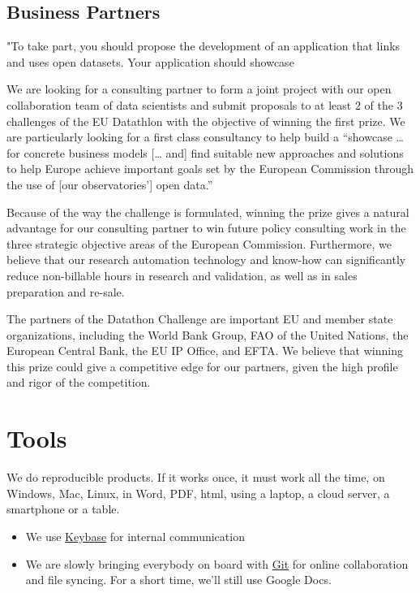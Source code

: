 \documentclass[
  a4paper,
  openany, a4paper, oneside]{book}
\begin{document}
\hypertarget{business-partners}{%
\section{Business Partners}\label{business-partners}}

"To take part, you should propose the development of an application that links and uses open datasets. Your application should showcase

We are looking for a consulting partner to form a joint project with our open collaboration team of data scientists and submit proposals to at least 2 of the 3 challenges of the EU Datathlon with the objective of winning the first prize. We are particularly looking for a first class consultancy to help build a ``showcase \ldots{} for concrete business models {[}\ldots{} and{]} find suitable new approaches and solutions to help Europe achieve important goals set by the European Commission through the use of {[}our observatories'{]} open data.''

Because of the way the challenge is formulated, winning the prize gives a natural advantage for our consulting partner to win future policy consulting work in the three strategic objective areas of the European Commission. Furthermore, we believe that our research automation technology and know-how can significantly reduce non-billable hours in research and validation, as well as in sales preparation and re-sale.

The partners of the Datathon Challenge are important EU and member state organizations, including the World Bank Group, FAO of the United Nations, the European Central Bank, the EU IP Office, and EFTA. We believe that winning this prize could give a competitive edge for our partners, given the high profile and rigor of the competition.

\hypertarget{tools}{%
\chapter{Tools}\label{tools}}

We do reproducible products. If it works once, it must work all the time, on Windows, Mac, Linux, in Word, PDF, html, using a laptop, a cloud server, a smartphone or a table.

\begin{itemize}
\item
  We use \protect\hyperlink{keybase}{Keybase} for internal communication
\item
  We are slowly bringing everybody on board with \protect\hyperlink{github}{Git} for online collaboration and file syncing. For a short time, we'll still use Google Docs.
\end{itemize}
\end{document}
